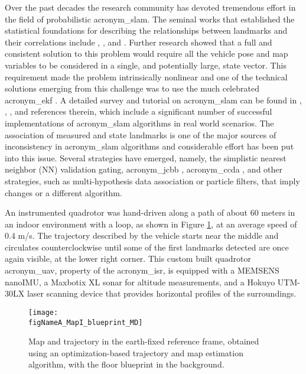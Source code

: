 Over the past decades the research community has devoted tremendous 
effort in the field of probabilistic \gls{acronym_slam}. 
The seminal works that established the statistical foundations for describing the 
relationships between landmarks and their correlations include \cite{smith:1986},
\cite{durrant:1988}, and \cite{smith:1990}. 
Further research showed that a 
full and consistent solution to this problem would require all the vehicle 
pose and map variables to be considered in a single, and potentially large, state vector. 
This requirement made the problem intrinsically nonlinear and one of the 
technical solutions emerging from this challenge was to use the much celebrated
\gls{acronym_ekf} \cite{csorba:1996,csorba:1997}. 
A detailed survey and tutorial on \gls{acronym_slam} can be found in \cite{durrant:2006}, 
\cite{bailey:2006}, \cite{thrun:2005}, and references therein, which include a significant 
number of successful implementations of \gls{acronym_slam} algorithms in real world scenarios.
The association of measured and state landmarks is one of 
the major sources of inconsistency in \gls{acronym_slam} algorithms and considerable effort 
has been put into this issue.
Several strategies have emerged, namely, the simplistic nearest neighbor (NN) 
validation gating, \gls{acronym_jcbb} \cite{neira:2001}, \gls{acronym_ccda} 
\cite{bailey:2002}, and other strategies, such as multi-hypothesis data 
association or particle filters, that imply changes or a different algorithm. 

An instrumented quadrotor was hand-driven along a path of about 60 meters in an 
indoor environment with a loop, as shown in Figure \ref{slam:fig:map}, at an 
average speed of 0.4 m/s.
The trajectory described by the vehicle starts near the middle 
and circulates counterclockwise until some of the first landmarks detected are once 
again visible, at the lower right corner.
This custom built quadrotor \gls{acronym_uav}, property of the \gls{acronym_isr}, is 
equipped with a MEMSENS nanoIMU, a Maxbotix XL sonar for altitude measurements, and a 
Hokuyo UTM-30LX laser scanning device that provides horizontal profiles of the surroundings.
\newcommand{\figNameA}[0]{20110729_run20111208-1135_cardume_part0161}
\begin{figure}
    \centering
    \texttt{[image: \\figNameA\_MapI\_blueprint\_MD]}\\
    \caption[Map and trajectory in the earth-fixed reference frame.]
            {   Map and trajectory in the earth-fixed reference frame, obtained 
                using an optimization-based trajectory and map estimation
                algorithm, with the floor blueprint in the background.}
    \label{slam:fig:map}
\end{figure}


